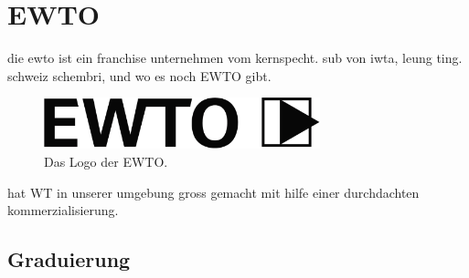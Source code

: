 
\newenvironment{WTGradSG}[1]{
	\subsection*{#1. Sch\"ulergrad}
	\texttt{[image: resources/graphics/graduierung/emblems/\#1]}
}{
}

\newenvironment{WTGradTG}[2]{
	\subsection*{#1. Techniker/Meistergrad}
	\ifthenelse{\equal{#2}{}}
	{}%
	{\texttt{[image: resources/graphics/graduierung/emblems/\#2]}}
}{
}


\renewcommand\chapterillustration{pushing_minimalistisch}
\chapter{EWTO}

die ewto ist ein franchise unternehmen vom kernspecht.
sub von iwta, leung ting.
schweiz schembri, und wo es noch EWTO gibt.

\begin{figure}[h]
	\centering
	\includegraphics[width=8cm]{resources/graphics/logos/ewto}
	\caption{Das Logo der EWTO.}
\end{figure}

hat WT in unserer umgebung gross gemacht mit hilfe einer durchdachten kommerzialisierung.


\newpage

\section{Graduierung}



